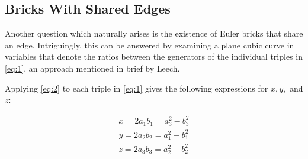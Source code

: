 \documentclass[11pt]{article}
\begin{document}
\subsection{Bricks With Shared Edges}
Another question which naturally arises is the existence of Euler bricks that share an edge.
Intriguingly, this can be answered by examining a plane cubic curve in variables that denote the ratios between the generators of the individual triples in \eqref{eq:1}, an approach mentioned in brief by Leech.

Applying \eqref{eq:2} to each triple in \eqref{eq:1} gives the following expressions for $x, y,$ and $z$:

\begin{equation}
\begin{aligned}
x=2a_1b_1=a_3^2-b_3^2 \\
y=2a_2b_2=a_1^2-b_1^2 \\
z=2a_3b_3=a_2^2-b_2^2
\end{aligned}
\label{eq:4}
\end{equation}
\end{document}
